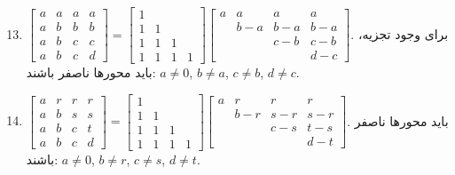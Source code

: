 \documentclass[12pt,a4paper]{article}
\begin{document}
{		
		\begin{enumerate}
			\setcounter{enumi}{12}
			\item $\begin{bmatrix} a & a & a & a \\ a & b & b & b \\ a & b & c & c \\ a & b & c & d \end{bmatrix} = \begin{bmatrix} 1 & & & \\ 1 & 1 & & \\ 1 & 1 & 1 & \\ 1 & 1 & 1 & 1 \end{bmatrix} \begin{bmatrix} a & a & a & a \\ & b-a & b-a & b-a \\ & & c-b & c-b \\ & & & d-c \end{bmatrix}$.
			برای وجود تجزیه، باید محورها ناصفر باشند: $a \neq 0$, $b \neq a$, $c \neq b$, $d \neq c$.
			
			\item $\begin{bmatrix} a & r & r & r \\ a & b & s & s \\ a & b & c & t \\ a & b & c & d \end{bmatrix} = \begin{bmatrix} 1 & & & \\ 1 & 1 & & \\ 1 & 1 & 1 & \\ 1 & 1 & 1 & 1 \end{bmatrix} \begin{bmatrix} a & r & r & r \\ & b-r & s-r & s-r \\ & & c-s & t-s \\ & & & d-t \end{bmatrix}$.
			باید محورها ناصفر باشند: $a \neq 0$, $b \neq r$, $c \neq s$, $d \neq t$.
			

\end{enumerate}}
\end{document}
